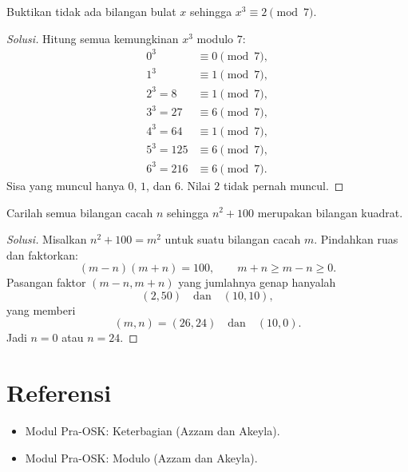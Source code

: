 \documentclass[12pt]{scrartcl}
\begin{document}
\begin{example}
Buktikan tidak ada bilangan bulat $x$ sehingga $x^3 \equiv 2 \pmod{7}$.
\end{example}
\begin{proof}[Solusi]
Hitung semua kemungkinan $x^3$ modulo $7$:
\begin{align*}
0^3 &\equiv 0 \pmod{7}, \\
1^3 &\equiv 1 \pmod{7}, \\
2^3 = 8 &\equiv 1 \pmod{7}, \\
3^3 = 27 &\equiv 6 \pmod{7}, \\
4^3 = 64 &\equiv 1 \pmod{7}, \\
5^3 = 125 &\equiv 6 \pmod{7}, \\
6^3 = 216 &\equiv 6 \pmod{7}.
\end{align*}
Sisa yang muncul hanya $0$, $1$, dan $6$.
Nilai $2$ tidak pernah muncul.
\end{proof}

\begin{example}
Carilah semua bilangan cacah $n$ sehingga $n^2 + 100$ merupakan bilangan kuadrat.
\end{example}
\begin{proof}[Solusi]
Misalkan $n^2 + 100 = m^2$ untuk suatu bilangan cacah $m$.
Pindahkan ruas dan faktorkan:
\[ (m - n)(m + n) = 100, \qquad m + n \ge m - n \ge 0. \]
Pasangan faktor $(m-n, m+n)$ yang jumlahnya genap hanyalah
\[ (2, 50) \quad \text{dan} \quad (10, 10), \]
yang memberi
\[ (m, n) = (26, 24) \quad \text{dan} \quad (10, 0). \]
Jadi $n = 0$ atau $n = 24$.
\end{proof}

\section{Referensi}
\begin{itemize}
    \item Modul Pra-OSK: Keterbagian (Azzam dan Akeyla).
    \item Modul Pra-OSK: Modulo (Azzam dan Akeyla).
\end{itemize}
\end{document}
